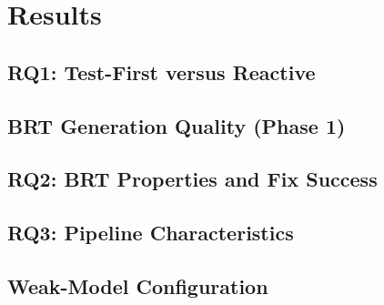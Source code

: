 \chapter{Results}
\label{ch:results}

\section{RQ1: Test-First versus Reactive}
\label{sec:results-rq1}

\section{BRT Generation Quality (Phase 1)}
\label{sec:results-brt}

\section{RQ2: BRT Properties and Fix Success}
\label{sec:results-rq2}

\section{RQ3: Pipeline Characteristics}
\label{sec:results-rq3}

\section{Weak-Model Configuration}
\label{sec:results-weak}
